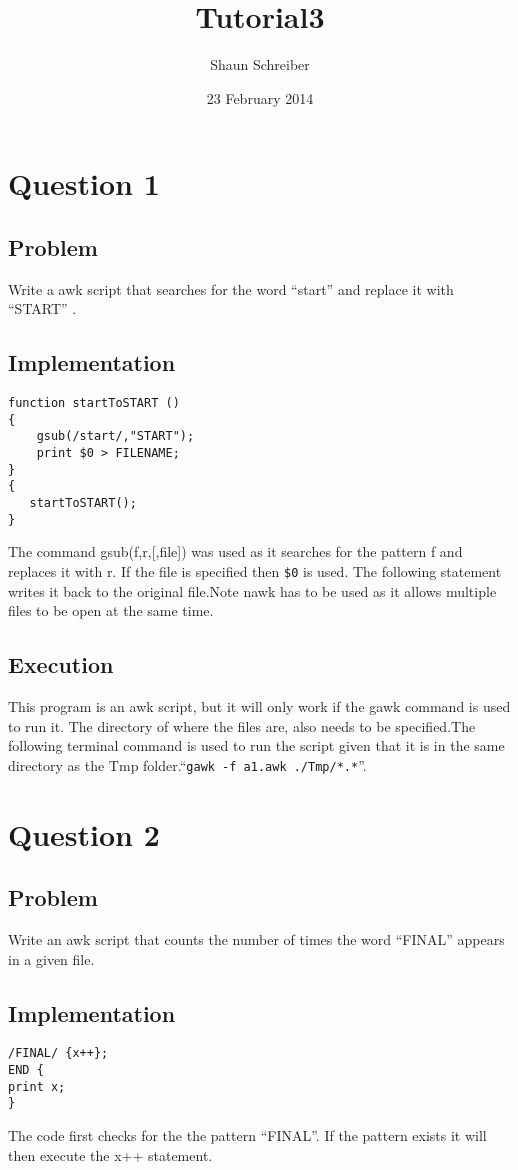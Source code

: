 \documentclass[a4paper, 10pt]{article}
\author{Shaun Schreiber}
\date{23 February 2014}
\title{Tutorial3}
\begin{document}
\maketitle
\section*{Question 1}
\subsection*{Problem}Write a awk script that searches for the word ``start'' and replace it with ``START'' .\subsection*{Implementation}
\begin{verbatim}
function startToSTART () 
{    
    gsub(/start/,"START");    
    print $0 > FILENAME;
}
{    
   startToSTART();
}
\end{verbatim}
The command gsub(f,r,[,file]) was used as it searches for the pattern f and replaces it with r. If the file is specified then \verb#$0# is used. The following statement writes it back to the original file.Note nawk has to be used as it allows multiple files to be open at the same time.
\subsection*{Execution}
This program is an awk script, but it will only work if the gawk command is used to run it. The directory of where the files are,  also needs to be specified.The following terminal command is used to run the script given that it is in the same directory as the Tmp folder.``\verb#gawk -f a1.awk ./Tmp/*.*#''.
\newpage
\section*{Question 2}
\subsection*{Problem}
Write an awk script that counts the number of times the word ``FINAL'' appears in a given file.\subsection*{Implementation}
\begin{verbatim}
/FINAL/ {x++};
END {
print x;
}
\end{verbatim}The code first checks for the the pattern ``FINAL''. If the pattern exists it will then execute the x++ statement.
\end{document}
